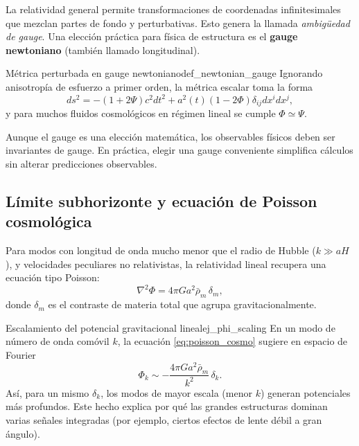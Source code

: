 La relatividad general permite transformaciones de coordenadas infinitesimales que mezclan partes de fondo y perturbativas. Esto genera la llamada \emph{ambigüedad de gauge}. Una elección práctica para física de estructura es el \textbf{gauge newtoniano} (también llamado longitudinal).

\begin{definicion}{Métrica perturbada en gauge newtoniano}{def_newtonian_gauge}
Ignorando anisotropía de esfuerzo a primer orden, la métrica escalar toma la forma
\begin{equation}
  ds^2=-(1+2\Psi)c^2dt^2+a^2(t)(1-2\Phi)\delta_{ij}dx^i dx^j,
\end{equation}
y para muchos fluidos cosmológicos en régimen lineal se cumple $\Phi\simeq\Psi$.
\end{definicion}

\begin{importante}
Aunque el gauge es una elección matemática, los observables físicos deben ser invariantes de gauge. En práctica, elegir una gauge conveniente simplifica cálculos sin alterar predicciones observables.
\end{importante}

\subsection{Límite subhorizonte y ecuación de Poisson cosmológica}

Para modos con longitud de onda mucho menor que el radio de Hubble ($k\gg aH$), y velocidades peculiares no relativistas, la relatividad lineal recupera una ecuación tipo Poisson:
\begin{equation}
\nabla^2\Phi = 4\pi G a^2\bar\rho_m\,\delta_m,
\label{eq:poisson_cosmo}
\end{equation}
donde $\delta_m$ es el contraste de materia total que agrupa gravitacionalmente.

\begin{ejemplo}{Escalamiento del potencial gravitacional lineal}{ej_phi_scaling}
En un modo de número de onda comóvil $k$, la ecuación \eqref{eq:poisson_cosmo} sugiere en espacio de Fourier
\begin{equation}
\Phi_k\sim -\frac{4\pi G a^2\bar\rho_m}{k^2}\,\delta_k.
\end{equation}
Así, para un mismo $\delta_k$, los modos de mayor escala (menor $k$) generan potenciales más profundos. Este hecho explica por qué las grandes estructuras dominan varias señales integradas (por ejemplo, ciertos efectos de lente débil a gran ángulo).
\end{ejemplo}


